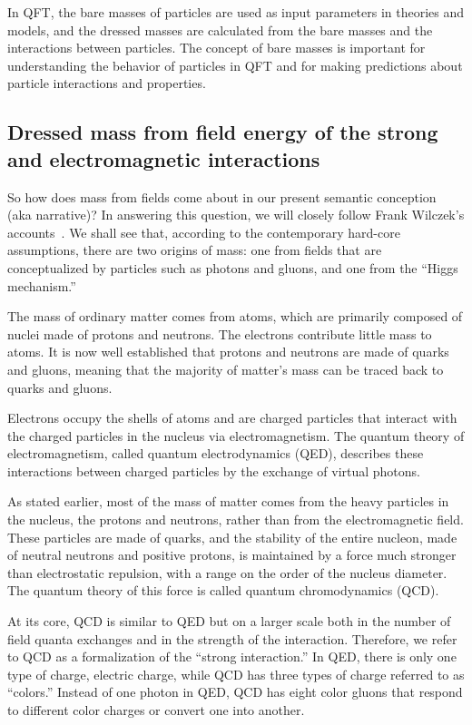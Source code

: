 In QFT, the bare masses of particles are used as input parameters in theories and models,
and the dressed masses are calculated from the bare masses and the interactions between particles.
The concept of bare masses is important for understanding the behavior of particles in QFT
and for making predictions about particle interactions and properties.

\subsection{Dressed mass from field energy of the strong and electromagnetic interactions}

So how does mass from fields come about in our present semantic conception (aka narrative)?
In answering this question, we will closely follow Frank Wilczek's accounts~\cite{Wilczek2003,Wilczek_2012}.
We shall see that, according to the contemporary hard-core assumptions, there are two origins of mass: one from fields that are conceptualized by
particles such as photons and gluons, and one from the ``Higgs mechanism.''


The mass of ordinary matter comes from atoms, which are primarily composed of nuclei made of protons and neutrons.
The electrons contribute little mass to atoms.
It is now well established that protons and neutrons are made of quarks and gluons,
meaning that the majority of matter's mass can be traced back to quarks and gluons.

Electrons occupy the shells of atoms and are charged particles that interact with the charged particles in the nucleus via electromagnetism.
The quantum theory of electromagnetism, called quantum electrodynamics (QED),
describes these interactions between charged particles by the exchange of virtual photons.

As stated earlier, most of the mass of matter comes from the heavy particles in the nucleus,
the protons and neutrons, rather than from the electromagnetic field.
These particles are made of quarks, and the stability of the entire nucleon,
made of neutral neutrons and positive protons, is maintained by a force much stronger than electrostatic repulsion,
with a range on the order of the nucleus diameter.
The quantum theory of this force is called quantum chromodynamics (QCD).

At its core, QCD is similar to QED but on a larger scale both in the number of field quanta exchanges and in the strength of the interaction.
Therefore, we refer to QCD as a formalization of the ``strong interaction.''
In QED, there is only one type of charge, electric charge, while QCD has three types of charge referred to as ``colors.''
Instead of one photon in QED, QCD has eight color gluons that respond to different color charges or convert one into another.

